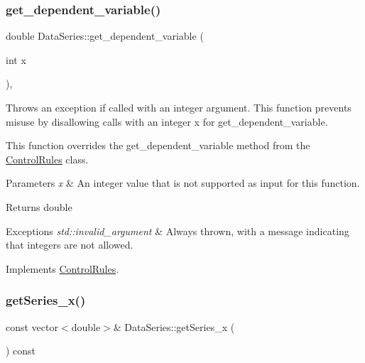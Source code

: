 \subsubsection{\texorpdfstring{get\+\_\+dependent\+\_\+variable()}{get\_dependent\_variable()}\hspace{0.1cm}{\footnotesize\ttfamily [2/2]}}
{\footnotesize\ttfamily double Data\+Series\+::get\+\_\+dependent\+\_\+variable (\begin{DoxyParamCaption}\item[{int}]{x }\end{DoxyParamCaption})\hspace{0.3cm}{\ttfamily [override]}, {\ttfamily [virtual]}}



Throws an exception if called with an integer argument. This function prevents misuse by disallowing calls with an integer {\ttfamily x} for {\ttfamily get\+\_\+dependent\+\_\+variable}. 

This function overrides the {\ttfamily get\+\_\+dependent\+\_\+variable} method from the {\ttfamily \mbox{\hyperlink{classControlRules}{Control\+Rules}}} class.


\begin{DoxyParams}{Parameters}
{\em x} & An integer value that is not supported as input for this function.\\
\hline
\end{DoxyParams}
\begin{DoxyReturn}{Returns}
double 
\end{DoxyReturn}

\begin{DoxyExceptions}{Exceptions}
{\em std\+::invalid\+\_\+argument} & Always thrown, with a message indicating that integers are not allowed. \\
\hline
\end{DoxyExceptions}


Implements \mbox{\hyperlink{classControlRules}{Control\+Rules}}.

\mbox{\label{classDataSeries_a8bc2554fe0708acf648adc9546a005e1}} 
\subsubsection{\texorpdfstring{get\+Series\+\_\+x()}{getSeries\_x()}}
{\footnotesize\ttfamily const vector$<$double$>$\& Data\+Series\+::get\+Series\+\_\+x (\begin{DoxyParamCaption}{ }\end{DoxyParamCaption}) const}



